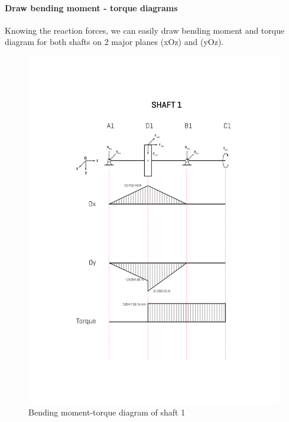 \paragraph{Draw bending moment - torque diagrams} Knowing the reaction forces, we can easily draw bending moment and torque diagram for both shafts on 2 major planes (xOz) and (yOz).

\begin{figure}[ht]
	\centering
	\includegraphics[width=150mm]{mshaft1.png}
	\caption{Bending moment-torque diagram of shaft 1}
	\label{mshaft1}
\end{figure}

